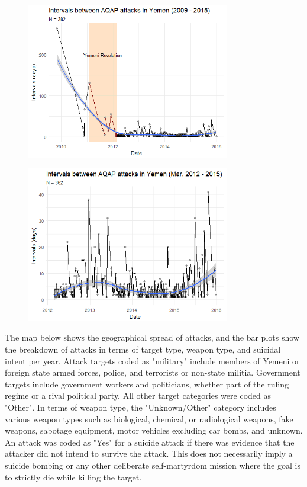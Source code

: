 \documentclass[letterpaper,12pt]{article}
\theoremstyle{definition}
\begin{document}
\begin{figure}[htb!]
  \includegraphics[width=3.5in]{intervals2009.png}
\end{figure}
\begin{figure}[htb!]
  \includegraphics[width=3.5in]{intervals2012.png}
\end{figure}

The map below shows the geographical spread of attacks, and the bar plots show the breakdown of attacks in terms of target type, weapon type, and suicidal intent per year. Attack targets coded as "military" include members of Yemeni or foreign state armed forces, police, and terrorists or non-state militia. Government targets include government workers and politicians, whether part of the ruling regime or a rival political party. All other target categories were coded as "Other". In terms of weapon type, the "Unknown/Other" category includes various weapon types such as biological, chemical, or radiological weapons, fake weapons, sabotage equipment, motor vehicles excluding car bombs, and unknown. An attack was coded as "Yes" for a suicide attack if there was evidence that the attacker did not intend to survive the attack. This does not necessarily imply a suicide bombing or any other deliberate self-martyrdom mission where the goal is to strictly die while killing the target.
\end{document}
